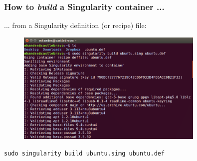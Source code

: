 \documentclass{beamer}
\begin{document}
\begin{frame}
   \frametitle{How to \textit{build} a Singularity container ...}
   ... from a Singularity definition (or recipe) file:
   \begin{figure}[htbp]
      \includegraphics[width=0.8\textwidth]{images/singularity-build-deffile-start.png}
   \end{figure}
   \lstinline{sudo singularity build ubuntu.simg ubuntu.def}
\end{frame}
\end{document}
